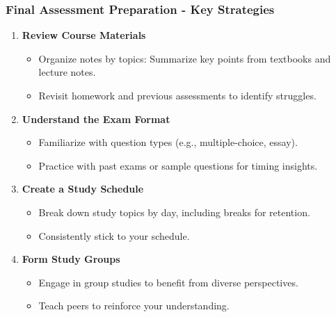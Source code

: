 \documentclass[aspectratio=169]{beamer}
\begin{document}
\begin{frame}[fragile]
    \frametitle{Final Assessment Preparation - Key Strategies}
    \begin{enumerate}
        \item \textbf{Review Course Materials}
            \begin{itemize}
                \item Organize notes by topics: Summarize key points from textbooks and lecture notes.
                \item Revisit homework and previous assessments to identify struggles.
            \end{itemize}
        \item \textbf{Understand the Exam Format}
            \begin{itemize}
                \item Familiarize with question types (e.g., multiple-choice, essay).
                \item Practice with past exams or sample questions for timing insights.
            \end{itemize}
        \item \textbf{Create a Study Schedule}
            \begin{itemize}
                \item Break down study topics by day, including breaks for retention.
                \item Consistently stick to your schedule.
            \end{itemize}
        \item \textbf{Form Study Groups}
            \begin{itemize}
                \item Engage in group studies to benefit from diverse perspectives.
                \item Teach peers to reinforce your understanding.
            \end{itemize}
    \end{enumerate}
\end{frame}
\end{document}
